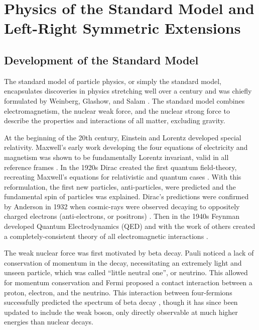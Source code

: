 \chapter{Physics of the Standard Model and Left-Right Symmetric Extensions}
\label{ch:theory}

\section{Development of the Standard Model}

The standard model of particle physics, or simply the standard model, encapsulates discoveries in physics stretching well over a century and was chiefly formulated by Weinberg, Glashow, and Salam \cite{PhysRevLett.19.1264}\cite{nla.cat-vn956113}.  The standard model combines electromagnetism, the nuclear weak force, and the nuclear strong force to describe the properties and interactions of all matter, excluding gravity.

At the beginning of the 20th century, Einstein and Lorentz developed special relativity. Maxwell's early work developing the four equations of electricity and magnetism was shown to be fundamentally Lorentz invariant, valid in all reference frames \cite{1898KNAB1427L}\cite{doi:10.1002/andp.19053221004}.  In the 1920s Dirac created the first quantum field-theory, recreating Maxwell's equations for relativistic and quantum cases \cite{doi:10.1098/rspa.1928.0023}.  With this reformulation, the first new particles, anti-particles, were predicted and the fundamental spin of particles was explained.  Dirac's predictions were confirmed by Anderson in 1932 when cosmic-rays were observed decaying to oppositely charged electrons (anti-electrons, or positrons) \cite{PhysRev.43.491}.  Then in the 1940s Feynman developed Quantum Electrodynamics (QED) and with the work of others created a completely-consistent theory of all electromagnetic interactions \cite{PhysRev.76.769}.

The weak nuclear force was first motivated by beta decay.  Pauli noticed a lack of conservation of momentum in the decay, necessitating an extremely light and unseen particle, which was called ``little neutral one'', or neutrino.  This allowed for momentum conservation and Fermi proposed a contact interaction between a proton, electron, and the neutrino.  This interaction between four-fermions successfully predicted the spectrum of beta decay \cite{Fermi1934}, though it has since been updated to include the weak boson, only directly observable at much higher energies than nuclear decays.

